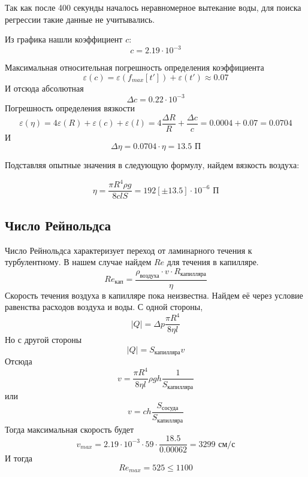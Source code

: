 \documentclass[a4paper,12pt]{article}%
\begin{document}
Так как после 400 секунды началось неравномерное вытекание воды, для поиска регрессии такие данные не учитывались.

Из графика нашли коэффициент $c$:
\begin{equation}
	c=2.19\cdot10^{-3}
\end{equation}

Максимальная относительная погрешность определения коэффициента 
\begin{equation}
	\varepsilon (c) = \varepsilon( f_{max}[t']) + \varepsilon (t')\approx 0.07
\end{equation}
И отсюда абсолютная
\begin{equation}
	\Delta c = 0.22\cdot10^{-3}
\end{equation}
Погрешность определения вязкости
\begin{equation}
	\varepsilon (\eta)=4\varepsilon(R)+\varepsilon (c)+\varepsilon (l)=
	4\frac{\Delta R}{R}+\frac{\Delta c}{c}=0.0004+0.07=0.0704
\end{equation}
И 
\begin{equation}
	\Delta \eta = 0.0704\cdot\eta=13.5 \text{ П}
\end{equation}

Подставляя опытные значения в следующую формулу, найдем вязкость воздуха:

\begin{equation}
	\eta=\frac{\pi R^4 \rho g}{8clS}=192[\pm13.5] \cdot 10^{-6} \text{ П}
\end{equation}


\subsection{Число Рейнольдса}

Число Рейнольдса характеризует переход от ламинарного течения к турбулентному. В нашем случае найдем $Re$ для течения в капилляре.
\begin{equation}
	Re_{кап}=\frac{\rho_\text{воздуха}\cdot v\cdot R_\text{капилляра}}{\eta}
\end{equation}
Скорость течения воздуха в капилляре пока неизвестна. Найдем её через условие равенства расходов воздуха и воды. С одной стороны,
\begin{equation}
	|Q|=\Delta p \frac{\pi R^4}{8\eta l}
\end{equation}
Но с другой стороны
\begin{equation}
	|Q|=S_\text{капилляра}v
\end{equation}
Отсюда
\begin{equation}
	v=\frac{\pi R^4}{8\eta l}\rho g h\frac{1}{S_\text{капилляра}}
\end{equation}
или
\begin{equation}
	v=ch\frac{S_\text{сосуда}}{S_\text{капилляра}}
\end{equation}
Тогда максимальная скорость будет
\begin{equation}
	v_{max}=2.19\cdot10^{-3}\cdot59\cdot\frac{18.5}{0.00062}=3299 \text{ см/с}
\end{equation}
И тогда
\begin{equation}
	Re_{max}=525 \leq 1100
\end{equation}
\end{document}
